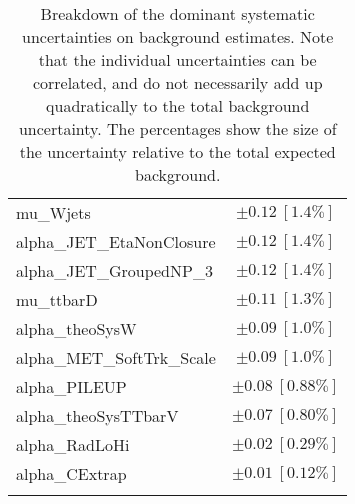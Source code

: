 \begin{table}
\begin{center}
\begin{tabular*}{\textwidth}{@{\extracolsep{\fill}}lc}
mu\_Wjets         & $\pm 0.12\ [1.4\%] $       \\
alpha\_JET\_EtaNonClosure         & $\pm 0.12\ [1.4\%] $       \\
alpha\_JET\_GroupedNP\_3         & $\pm 0.12\ [1.4\%] $       \\
mu\_ttbarD         & $\pm 0.11\ [1.3\%] $       \\
alpha\_theoSysW         & $\pm 0.09\ [1.0\%] $       \\
alpha\_MET\_SoftTrk\_Scale         & $\pm 0.09\ [1.0\%] $       \\
alpha\_PILEUP         & $\pm 0.08\ [0.88\%] $       \\
alpha\_theoSysTTbarV         & $\pm 0.07\ [0.80\%] $       \\
alpha\_RadLoHi         & $\pm 0.02\ [0.29\%] $       \\
alpha\_CExtrap         & $\pm 0.01\ [0.12\%] $       \\
\noalign{\smallskip}\hline\noalign{\smallskip}
\end{tabular*}
\end{center}
\caption[Breakdown of uncertainty on background estimates]{
Breakdown of the dominant systematic uncertainties on background estimates.
Note that the individual uncertainties can be correlated, and do not necessarily add up quadratically to 
the total background uncertainty. The percentages show the size of the uncertainty relative to the total expected background.
\label{table.results.bkgestimate.uncertainties.SRD_high}}
\end{table}
%